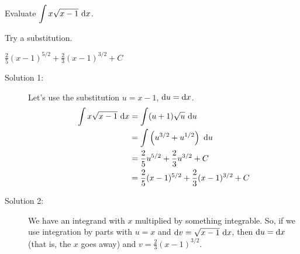\begin{question}
Evaluate $\displaystyle\int x\sqrt{x-1}~\mathrm{d}x$.
\end{question}
\begin{hint}
Try a substitution.
\end{hint}
\begin{answer}
$\displaystyle\frac{2}{5}(x-1)^{5/2} + \frac{2}{3}(x-1)^{3/2}+C$
\end{answer}
\begin{solution}
\begin{description}
\item[Solution 1:]
Let's use the substitution $u=x-1$, $\mathrm{d}u=\mathrm{d}x$.
\begin{align*}
\int x\sqrt{x-1}~\mathrm{d}x&=\int(u+1)\sqrt{u}~\mathrm{d}u\\
&=\int \left(u^{3/2}+u^{1/2}\right)~\mathrm{d}u\\
&=\frac{2}{5}u^{5/2} + \frac{2}{3}u^{3/2}+C\\
&=\frac{2}{5}(x-1)^{5/2} + \frac{2}{3}(x-1)^{3/2}+C
\end{align*}
\item[Solution 2:]
We have an integrand with $x$ multiplied by something integrable. So, if we use integration by parts with $u=x$ and $\mathrm{d}v = \sqrt{x-1}~\mathrm{d}x$, then $\mathrm{d}u=\mathrm{d}x$ (that is, the $x$ goes away) and $v = \frac{2}{3}(x-1)^{3/2}$.


\end{description}
\end{solution}
